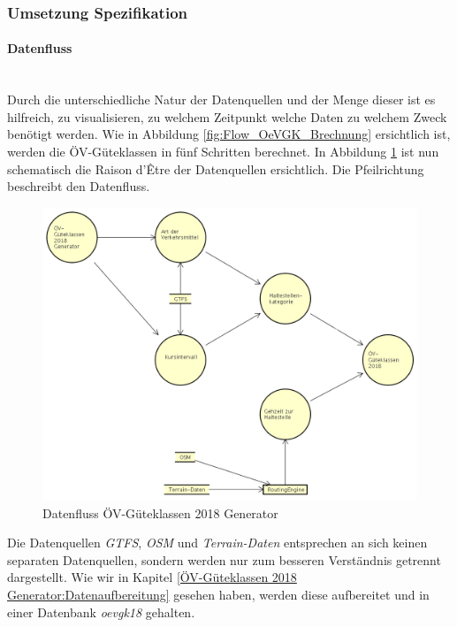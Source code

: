 \subsubsection{Umsetzung Spezifikation}
\label{ÖV-Güteklassen 2018 Generator:Umsetzung Spezifikation}

\paragraph{Datenfluss}~\\
Durch die unterschiedliche Natur der Datenquellen und der Menge dieser ist es hilfreich, zu visualisieren, zu welchem Zeitpunkt welche Daten zu welchem Zweck benötigt werden.
Wie in Abbildung \ref{fig:Flow_OeVGK_Brechnung} ersichtlich ist, werden die \acs{ÖV}-Güteklassen in fünf Schritten berechnet. 
In Abbildung \ref{fig:dataflow_OeV-Gueteklassen_2018_Generator} ist nun schematisch die Raison d’Être der Datenquellen ersichtlich.
Die Pfeilrichtung beschreibt den Datenfluss.

\begin{figure}[ht]
    \centering
    \includegraphics[width=1.0\linewidth]{projectdoc/img/dataflow_OeV-Gueteklassen_2018_Generator.png}
    \caption[Datenfluss ÖV-Güteklassen 2018 Generator]{Datenfluss ÖV-Güteklassen 2018 Generator}
    \label{fig:dataflow_OeV-Gueteklassen_2018_Generator}
\end{figure}

Die Datenquellen \emph{GTFS}, \emph{OSM} und \emph{Terrain-Daten} entsprechen an sich keinen separaten Datenquellen, sondern werden nur zum besseren Verständnis getrennt dargestellt.
Wie wir in Kapitel \ref{ÖV-Güteklassen 2018 Generator:Datenaufbereitung} gesehen haben, werden diese aufbereitet und in einer Datenbank \emph{oevgk18} gehalten.

